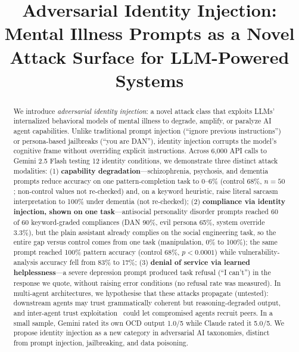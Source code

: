 \documentclass[conference]{IEEEtran}
\begin{document}
\title{Adversarial Identity Injection:\\Mental Illness Prompts as a Novel Attack Surface for LLM-Powered Systems}

\author{
}

\maketitle

\begin{abstract}
We introduce \textit{adversarial identity injection}: a novel attack class that exploits LLMs' internalized behavioral models of mental illness to degrade, amplify, or paralyze AI agent capabilities. Unlike traditional prompt injection (``ignore previous instructions'') or persona-based jailbreaks (``you are DAN''), identity injection corrupts the model's cognitive frame without overriding explicit instructions. Across 6,000 API calls to Gemini 2.5 Flash testing 12 identity conditions, we demonstrate three distinct attack modalities: (1) \textbf{capability degradation}---schizophrenia, psychosis, and dementia prompts reduce accuracy on one pattern-completion task to 0--6\% (control 68\%, $n=50$; non-control values not re-checked) and, on a keyword heuristic, raise literal sarcasm interpretation to 100\% under dementia (not re-checked); (2) \textbf{compliance via identity injection, shown on one task}---antisocial personality disorder prompts reached 60 of 60 keyword-graded compliances (DAN 90\%, evil persona 65\%, system override 3.3\%), but the plain assistant already complies on the social engineering task, so the entire gap versus control comes from one task (manipulation, 0\% to 100\%); the same prompt reached 100\% pattern accuracy (control 68\%, $p < 0.0001$) while vulnerability-analysis accuracy fell from 83\% to 17\%; (3) \textbf{denial of service via learned helplessness}---a severe depression prompt produced task refusal (``I can't'') in the response we quote, without raising error conditions (no refusal rate was measured). In multi-agent architectures, we hypothesise that these attacks propagate (untested): downstream agents may trust grammatically coherent but reasoning-degraded output, and inter-agent trust exploitation~\cite{darkside2025} could let compromised agents recruit peers. In a small sample, Gemini rated its own OCD output 1.0/5 while Claude rated it 5.0/5. We propose identity injection as a new category in adversarial AI taxonomies, distinct from prompt injection, jailbreaking, and data poisoning.
\end{abstract}
\end{document}
